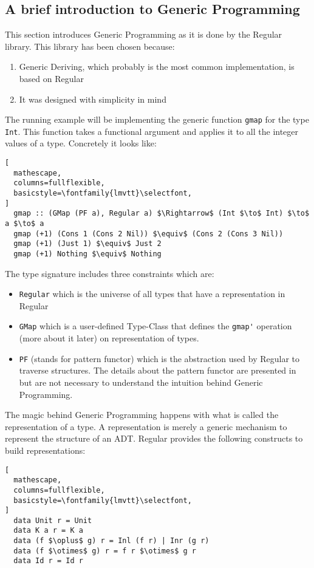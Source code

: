 \documentclass[8pt]{extarticle}
\begin{document}
\subsection{A brief introduction to Generic Programming}
This section introduces Generic Programming as it is done by the Regular\cite{Regular} library. This library has been chosen because:
\begin{enumerate}
\item Generic Deriving, which probably is the most common implementation, is based on Regular
\item It was designed with simplicity in mind
\end{enumerate}
The running example will be implementing the generic function \verb+gmap+ for the type \verb+Int+. This function takes a functional argument and applies it to all the integer values of a type. Concretely it looks like:
\begin{lstlisting}[
  mathescape,
  columns=fullflexible,
  basicstyle=\fontfamily{lmvtt}\selectfont,
]
  gmap :: (GMap (PF a), Regular a) $\Rightarrow$ (Int $\to$ Int) $\to$ a $\to$ a
  gmap (+1) (Cons 1 (Cons 2 Nil)) $\equiv$ (Cons 2 (Cons 3 Nil))
  gmap (+1) (Just 1) $\equiv$ Just 2
  gmap (+1) Nothing $\equiv$ Nothing
\end{lstlisting}
The type signature includes three constraints which are:
\begin{itemize}
\item \verb+Regular+ which is the universe of all types that have a representation in Regular
\item \verb+GMap+ which is a user-defined Type-Class that defines the \verb+gmap'+ operation (more about it later) on representation of types.
\item \verb+PF+ (stands for pattern functor) which is the abstraction used by Regular to traverse structures. The details about the pattern functor are presented in \cite{Regular} but are not necessary to understand the intuition behind Generic Programming.
\end{itemize}
The magic behind Generic Programming happens with what is called the representation of a type. A representation is merely a generic mechanism to represent the structure of an ADT. Regular provides the following constructs to build representations:
\begin{lstlisting}[
  mathescape,
  columns=fullflexible,
  basicstyle=\fontfamily{lmvtt}\selectfont,
]
  data Unit r = Unit
  data K a r = K a
  data (f $\oplus$ g) r = Inl (f r) | Inr (g r)
  data (f $\otimes$ g) r = f r $\otimes$ g r
  data Id r = Id r
\end{lstlisting}
\end{document}
